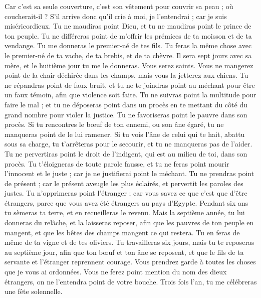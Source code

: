 \begin{multicols}{2}
Car c'est sa seule couverture, c'est son vêtement pour couvrir sa peau ; où coucherait-il ? S'il arrive donc qu'il crie à moi, je l'entendrai ; car je suis miséricordieux.
Tu ne maudiras point Dieu, et tu ne maudiras point le prince de ton peuple.
Tu ne différeras point de m'offrir les prémices de ta moisson et de ta vendange. Tu me donneras le premier-né de tes fils.
Tu feras la même chose avec le premier-né de ta vache, de ta brebis, et de ta chèvre. Il sera sept jours avec sa mère, et le huitième jour tu me le donneras.
Vous serez saints. Vous ne mangerez point de la chair déchirée dans les champs, mais vous la jetterez aux chiens.
\VerseOne{}Tu ne répandras point de faux bruit, et tu ne te joindras point au méchant pour être un faux témoin, afin que violence soit faite.
Tu ne suivras point la multitude pour faire le mal ; et tu ne déposeras point dans un procès en te mettant du côté du grand nombre pour violer la justice.
Tu ne favoriseras point le pauvre dans son procès.
Si tu rencontres le bœuf de ton ennemi, ou son âne égaré, tu ne manqueras point de le lui ramener.
Si tu vois l'âne de celui qui te hait, abattu sous sa charge, tu t'arrêteras pour le secourir, et tu ne manqueras pas de l'aider.
Tu ne pervertiras point le droit de l'indigent, qui est au milieu de toi, dans son procès.
Tu t'éloigneras de toute parole fausse, et tu ne feras point mourir l'innocent et le juste ; car je ne justifierai point le méchant.
Tu ne prendras point de présent ; car le présent aveugle les plus éclairés, et pervertit les paroles des justes.
Tu n'opprimeras point l'étranger ; car vous savez ce que c'est que d'être étrangers, parce que vous avez été étrangers au pays d'Egypte.
Pendant six ans tu sèmeras ta terre, et en recueilleras le revenu.
Mais la septième année, tu lui donneras du relâche, et la laisseras reposer, afin que les pauvres de ton peuple en mangent, et que les bêtes des champs mangent ce qui restera. Tu en feras de même de ta vigne et de tes oliviers.
Tu travailleras six jours, mais tu te reposeras au septième jour, afin que ton bœuf et ton âne se reposent, et que le fils de ta servante et l'étranger reprennent courage.
Vous prendrez garde à toutes les choses que je vous ai ordonnées. Vous ne ferez point mention du nom des dieux étrangers, on ne l'entendra point de votre bouche.
Trois fois l'an, tu me célébreras une fête solennelle.

\end{multicols}
